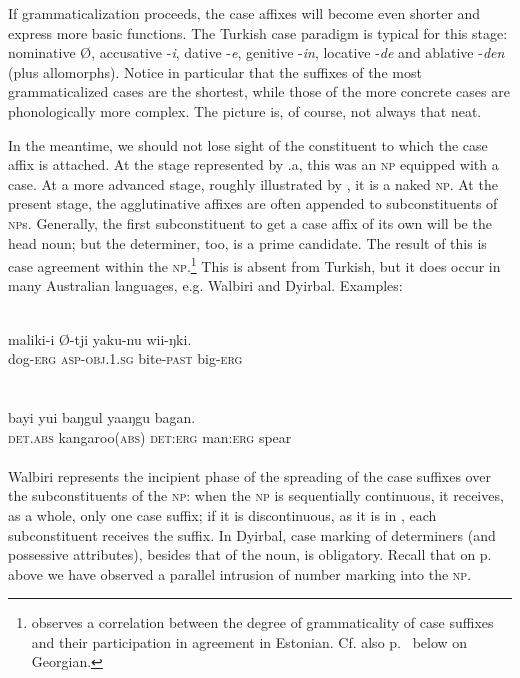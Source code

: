 If grammaticalization proceeds, the case affixes will become even shorter and express more basic functions. The Turkish case paradigm is typical for this stage: nominative Ø, accusative -\textit{i}, dative -\textit{e}, genitive -\textit{in}, locative -\textit{de} and ablative -\textit{den} (plus allomorphs). Notice in particular that the suffixes of the most grammaticalized cases are the shortest, while those of the more concrete cases are phonologically more complex. The picture is, of course, not always that neat.

In the meantime, we should not lose sight of the constituent to which the case affix is attached. At the stage represented by .a, this was an \textsc{np} equipped with a case. At a more advanced stage, roughly illustrated by , it is a naked \textsc{np}. At the present stage, the agglutinative affixes are often appended to subconstituents of \textsc{np}s. Generally, the first subconstituent to get a case affix of its own will be the head noun; but the determiner, too, is a prime candidate. The result of this is case agreement within the \textsc{np}.\footnote{\citet[117]{Kahr1976} observes a correlation between the degree of grammaticality of case suffixes and their participation in agreement in Estonian. Cf. also p.~\pageref{page101}\chkfn%
 below on Georgian.} This is absent from Turkish, but it does occur in many Australian languages, e.g. Walbiri and Dyirbal. Examples:

\ea\label{ex:E59}
\\
\gll   maliki-i  Ø-tji  yaku-nu  wii-ŋki.\\
 dog-\textsc{erg}  \textsc{asp}-\textsc{obj}.1.\textsc{sg}  bite-\textsc{past}  big-\textsc{erg}\\
\\
\z
\noindent \ea\label{ex:E60}
\\
\gll bayi  yui  baŋgul  yaaŋgu  bagan.\\
 \textsc{det}.\textsc{abs}  kangaroo(\textsc{abs})  \textsc{det}:\textsc{erg}  man:\textsc{erg}  spear\\
\\
\z
\noindent Walbiri represents the incipient phase of the spreading of the case suffixes over the subconstituents of the \textsc{np}: when the \textsc{np} is sequentially continuous, it receives, as a whole, only one case suffix; if it is discontinuous, as it is in , each subconstituent receives the suffix.\label{page92} In Dyirbal, case marking of determiners (and possessive attributes), besides that of the noun, is obligatory. Recall that on p.~\pageref{page63}\chk%
  above we have observed a parallel intrusion of number marking into the \textsc{np}.

